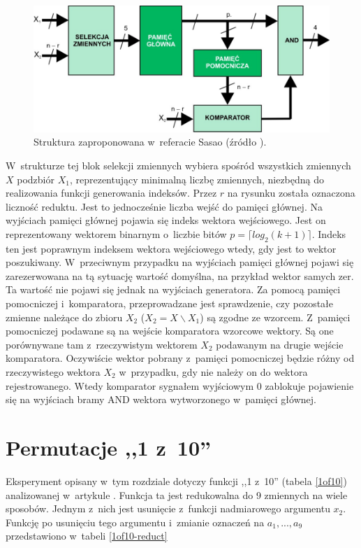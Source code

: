 \begin{figure}[H]
\centering
\includegraphics[width = 13cm]{chapter04/sasao-structure.jpg}
\caption{Struktura zaproponowana w~referacie Sasao (źródło \cite{sasao-workshop}).}
\label{fig:sasao-structure}
\end{figure}

W~strukturze tej blok selekcji zmiennych wybiera spośród wszystkich zmiennych $X$ podzbiór $X_1$,
reprezentujący minimalną liczbę zmiennych,
niezbędną do realizowania funkcji generowania indeksów.
Przez $r$ na rysunku została oznaczona liczność reduktu.
Jest to jednocześnie liczba wejść do pamięci głównej.
Na wyjściach pamięci głównej pojawia się indeks wektora wejściowego. %
Jest on reprezentowany wektorem binarnym o~liczbie bitów $p = \lceil log_2 (k+1)\rceil$.
Indeks ten jest poprawnym indeksem wektora wejściowego wtedy,
gdy jest to wektor poszukiwany.
W~przeciwnym przypadku na wyjściach pamięci głównej pojawi się zarezerwowana na tą sytuację wartość domyślna,
na przykład wektor samych zer.
Ta wartość nie pojawi się jednak na wyjściach generatora.
Za pomocą pamięci pomocniczej i~komparatora,
przeprowadzane jest sprawdzenie,
czy pozostałe zmienne należące do zbioru $X_2$ ($X_2 = X \backslash X_1$) są zgodne ze wzorcem.
Z~pamięci pomocniczej podawane są na wejście komparatora wzorcowe wektory.
Są one porównywane tam z~rzeczywistym wektorem $X_2$ podawanym na drugie wejście komparatora.
Oczywiście wektor pobrany z~pamięci pomocniczej będzie różny od rzeczywistego wektora $X_2$ w~przypadku,
gdy nie należy on do wektora rejestrowanego.
Wtedy komparator sygnałem wyjściowym 0 zablokuje pojawienie się na wyjściach bramy AND wektora wytworzonego w~pamięci głównej.

\section{Permutacje ,,1 z~10''}

Eksperyment opisany w~tym rozdziale dotyczy funkcji ,,1 z~10'' (tabela \ref{1of10}) analizowanej w~artykule \cite{sasao-s-min}.
Funkcja ta jest redukowalna do 9 zmiennych na wiele sposobów.
Jednym z~nich jest usunięcie z~funkcji nadmiarowego argumentu $x_2$.
Funkcję po usunięciu tego argumentu i~zmianie oznaczeń na $a_1, ..., a_9$ przedstawiono w~tabeli \ref{1of10-reduct}

